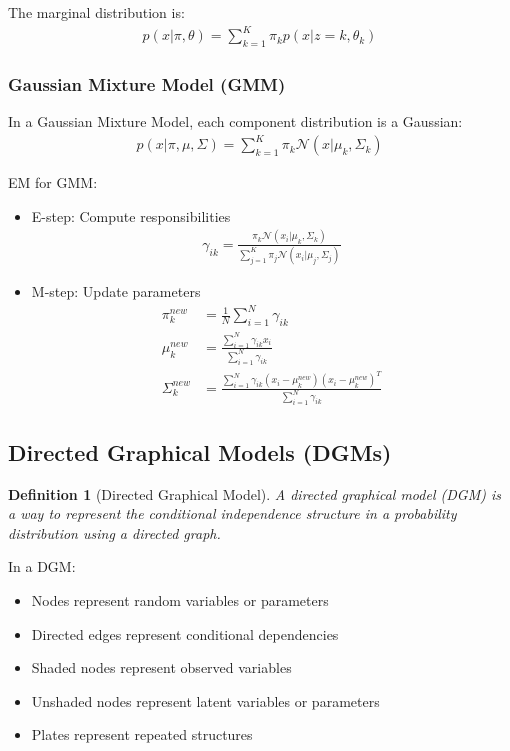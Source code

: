 \documentclass{article}
\newtheorem{definition}{Definition}
\begin{document}
The marginal distribution is:
\begin{align}
p(x|\pi, \theta) = \sum_{k=1}^{K}\pi_k p(x|z=k, \theta_k)
\end{align}

\subsubsection{Gaussian Mixture Model (GMM)}
In a Gaussian Mixture Model, each component distribution is a Gaussian:
\begin{align}
p(x|\pi, \mu, \Sigma) = \sum_{k=1}^{K}\pi_k \mathcal{N}(x|\mu_k, \Sigma_k)
\end{align}

EM for GMM:
\begin{itemize}
\item E-step: Compute responsibilities
\begin{align}
\gamma_{ik} = \frac{\pi_k \mathcal{N}(x_i|\mu_k, \Sigma_k)}{\sum_{j=1}^{K}\pi_j \mathcal{N}(x_i|\mu_j, \Sigma_j)}
\end{align}
\item M-step: Update parameters
\begin{align}
\pi_k^{new} &= \frac{1}{N}\sum_{i=1}^{N}\gamma_{ik}\\
\mu_k^{new} &= \frac{\sum_{i=1}^{N}\gamma_{ik}x_i}{\sum_{i=1}^{N}\gamma_{ik}}\\
\Sigma_k^{new} &= \frac{\sum_{i=1}^{N}\gamma_{ik}(x_i - \mu_k^{new})(x_i - \mu_k^{new})^T}{\sum_{i=1}^{N}\gamma_{ik}}
\end{align}
\end{itemize}

\subsection{Directed Graphical Models (DGMs)}
\begin{definition}[Directed Graphical Model]
A directed graphical model (DGM) is a way to represent the conditional independence structure in a probability distribution using a directed graph.
\end{definition}

In a DGM:
\begin{itemize}
\item Nodes represent random variables or parameters
\item Directed edges represent conditional dependencies
\item Shaded nodes represent observed variables
\item Unshaded nodes represent latent variables or parameters
\item Plates represent repeated structures
\end{itemize}
\end{document}
